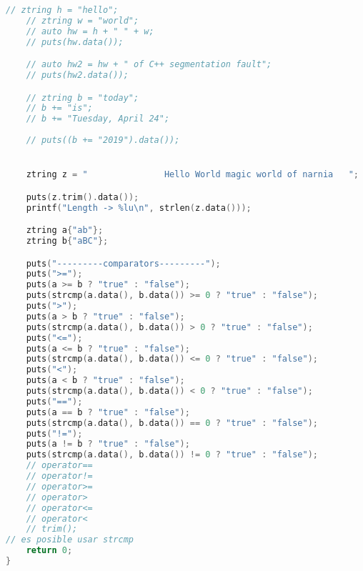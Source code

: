 \begin{lstlisting}[language=C++, caption={Ztring}]
    // ztring h = "hello";
    // ztring w = "world";
    // auto hw = h + " " + w;
    // puts(hw.data());

    // auto hw2 = hw + " of C++ segmentation fault";
    // puts(hw2.data());

    // ztring b = "today";
    // b += "is";
    // b += "Tuesday, April 24";
    
    // puts((b += "2019").data());


    ztring z = "               Hello World magic world of narnia   ";

    puts(z.trim().data());
    printf("Length -> %lu\n", strlen(z.data()));

    ztring a{"ab"};
    ztring b{"aBC"};

    puts("---------comparators---------");
    puts(">=");
    puts(a >= b ? "true" : "false");
    puts(strcmp(a.data(), b.data()) >= 0 ? "true" : "false");
    puts(">");
    puts(a > b ? "true" : "false");
    puts(strcmp(a.data(), b.data()) > 0 ? "true" : "false");
    puts("<=");
    puts(a <= b ? "true" : "false");
    puts(strcmp(a.data(), b.data()) <= 0 ? "true" : "false");
    puts("<");
    puts(a < b ? "true" : "false");
    puts(strcmp(a.data(), b.data()) < 0 ? "true" : "false");
    puts("==");
    puts(a == b ? "true" : "false");
    puts(strcmp(a.data(), b.data()) == 0 ? "true" : "false");
    puts("!=");
    puts(a != b ? "true" : "false");
    puts(strcmp(a.data(), b.data()) != 0 ? "true" : "false");
    // operator==
    // operator!=
    // operator>=
    // operator>
    // operator<=
    // operator<
    // trim();
// es posible usar strcmp
    return 0;
}
\end{lstlisting}